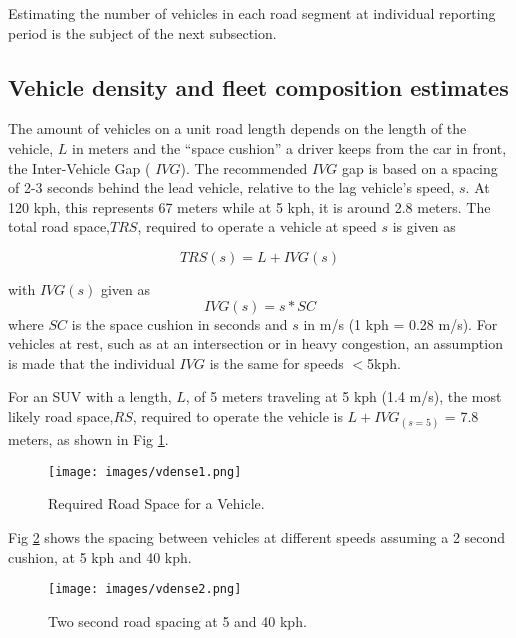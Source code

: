 \documentclass[preprint,12pt,a4paper,authoryear]{elsarticle}
\begin{document}
\begin{linenumbers}
Estimating the number of vehicles in each road segment at individual reporting period is the subject of the next subsection. 

\subsection{Vehicle density and fleet composition estimates}
The amount of vehicles on a unit road length depends on the length of the vehicle, $L$ in meters and the ``space cushion” a driver keeps from the car in front, the Inter-Vehicle Gap ( $IVG$).  The recommended $IVG$ gap is based on a spacing of 2-3 seconds \citep{NYDMV2015} behind the lead vehicle, relative to the lag vehicle's speed, $s$.  At 120 kph, this represents 67 meters while at 5 kph, it is around 2.8 meters.  The total road space,$TRS$, required to operate a vehicle at speed $s$ is given as

\begin{equation}
\label{eq:roadspace}
TRS(s)=L + IVG(s)
\end{equation}

\noindent
with $IVG(s)$ given as
%
\begin{equation}
\label{eq:ivg}
IVG(s) = s * SC
\end{equation}
%
\noindent
where $SC$ is the space cushion in seconds and $s$ in m/s (1 kph = 0.28 m/s). For vehicles at rest, such as at an intersection or in heavy congestion, an assumption is made that the individual $IVG$ is the same for speeds $<$5kph.

For an SUV with a length, $L$, of 5 meters traveling at 5 kph (1.4 m/s), the most likely road space,$RS$, required to operate the vehicle is $L + IVG_{(s=5)}$ = 7.8 meters, as shown in Fig \ref{fig1:roadspace}. 

\begin{figure}[H]
\texttt{[image: images/vdense1.png]} 
\caption{Required Road Space for a Vehicle.}
\label{fig1:roadspace}
\end{figure}
%
Fig \ref{fig2:2secroadspace} shows the spacing between vehicles at different speeds assuming a 2 second cushion, at 5 kph and 40 kph.
%
%
\begin{figure}[H]
\texttt{[image: images/vdense2.png]} 
\caption{Two second road spacing at 5 and 40 kph.}
\label{fig2:2secroadspace}
\end{figure}
%


\end{linenumbers}
\end{document}
